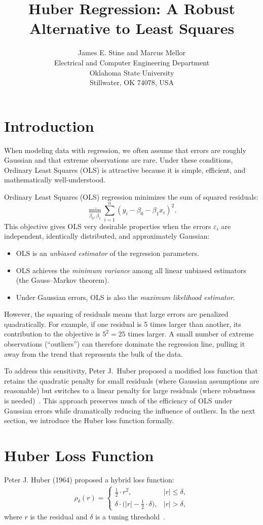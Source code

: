 \documentclass[10pt]{article}
\title{Huber Regression: A Robust Alternative to Least Squares}
\author{James E. Stine and Marcus Mellor\\
Electrical and Computer Engineering Department\\
Oklahoma State University\\
Stillwater, OK 74078, USA}
\date{}
\date{}
\begin{document}
\maketitle

\section*{Introduction}
When modeling data with regression, we often assume that errors are roughly Gaussian and that extreme observations are rare. Under these conditions, Ordinary Least Squares (OLS) is attractive because it is simple, efficient, and mathematically well-understood. 

Ordinary Least Squares (OLS) regression minimizes the sum of squared residuals:
\[
\min_{\beta_0,\beta_1} \sum_{i=1}^n (y_i - \beta_0 - \beta_1 x_i)^2.
\]
This objective gives OLS very desirable properties when the errors $\varepsilon_i$ are independent, identically distributed, and approximately Gaussian:
\begin{itemize}[leftmargin=1.5em]
\item OLS is an \emph{unbiased estimator} of the regression parameters.
\item OLS achieves the \emph{minimum variance} among all linear unbiased estimators (the Gauss--Markov theorem).
\item Under Gaussian errors, OLS is also the \emph{maximum likelihood estimator}.
\end{itemize}

However, the squaring of residuals means that large errors are penalized quadratically. For example, if one residual is 5 times larger than another, its contribution to the objective is $5^2 = 25$ times larger. A small number of extreme observations (``outliers'') can therefore dominate the regression line, pulling it away from the trend that represents the bulk of the data. 

To address this sensitivity, Peter J.~Huber proposed a modified loss function that retains the quadratic penalty for small residuals (where Gaussian assumptions are reasonable) but switches to a linear penalty for large residuals (where robustness is needed)~\cite{huber1964}. This approach preserves much of the efficiency of OLS under Gaussian errors while dramatically reducing the influence of outliers. In the next section, we introduce the Huber loss function formally.

\section*{Huber Loss Function}
Peter J. Huber (1964) proposed a hybrid loss function:
\begin{eqnarray*}
\rho_\delta(r) =
\begin{cases}
\tfrac{1}{2} \cdot r^2, & |r| \leq \delta, \\[6pt]
\delta \cdot \big(|r| - \tfrac{1}{2} \cdot \delta \big), & |r| > \delta,
\end{cases}
\end{eqnarray*}
where $r$ is the residual and $\delta$ is a tuning threshold~\cite{huber1964}.
\end{document}
